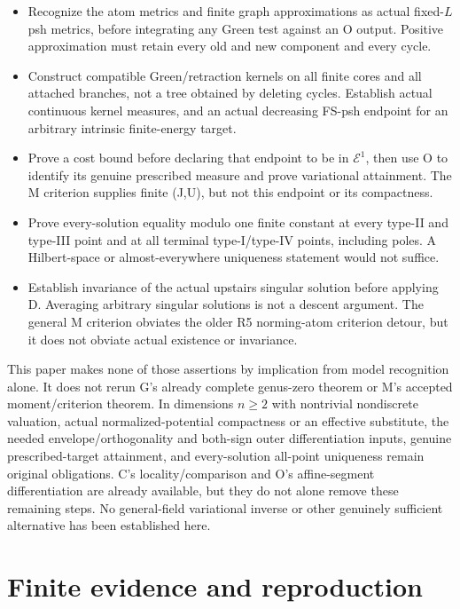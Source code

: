 \documentclass[
  11pt,
]{article}
\providecommand{\tightlist}{%
  \setlength{\itemsep}{0pt}\setlength{\parskip}{0pt}}
\begin{document}
\begin{itemize}
\tightlist
\item
  Recognize the atom metrics and finite graph approximations as actual
  fixed-\(L\) psh metrics, before integrating any Green test against an
  O output. Positive approximation must retain every old and new
  component and every cycle.
\item
  Construct compatible Green/retraction kernels on all finite cores and
  all attached branches, not a tree obtained by deleting cycles.
  Establish actual continuous kernel measures, and an actual decreasing
  FS-psh endpoint for an arbitrary intrinsic finite-energy target.
\item
  Prove a cost bound before declaring that endpoint to be in
  \(\mathcal E^1\), then use O to identify its genuine prescribed
  measure and prove variational attainment. The M criterion supplies
  finite (J,U), but not this endpoint or its compactness.
\item
  Prove every-solution equality modulo one finite constant at every
  type-II and type-III point and at all terminal type-I/type-IV points,
  including poles. A Hilbert-space or almost-everywhere uniqueness
  statement would not suffice.
\item
  Establish invariance of the actual upstairs singular solution before
  applying D. Averaging arbitrary singular solutions is not a descent
  argument. The general M criterion obviates the older R5 norming-atom
  criterion detour, but it does not obviate actual existence or
  invariance.
\end{itemize}

This paper makes none of those assertions by implication from model
recognition alone. It does not rerun G's already complete genus-zero
theorem or M's accepted moment/criterion theorem. In dimensions
\(n\geq2\) with nontrivial nondiscrete valuation, actual
normalized-potential compactness or an effective substitute, the needed
envelope/orthogonality and both-sign outer differentiation inputs,
genuine prescribed-target attainment, and every-solution all-point
uniqueness remain original obligations. C's locality/comparison and O's
affine-segment differentiation are already available, but they do not
alone remove these remaining steps. No general-field variational inverse
or other genuinely sufficient alternative has been established here.

\section{Finite evidence and
reproduction}\label{finite-evidence-and-reproduction}
\end{document}
